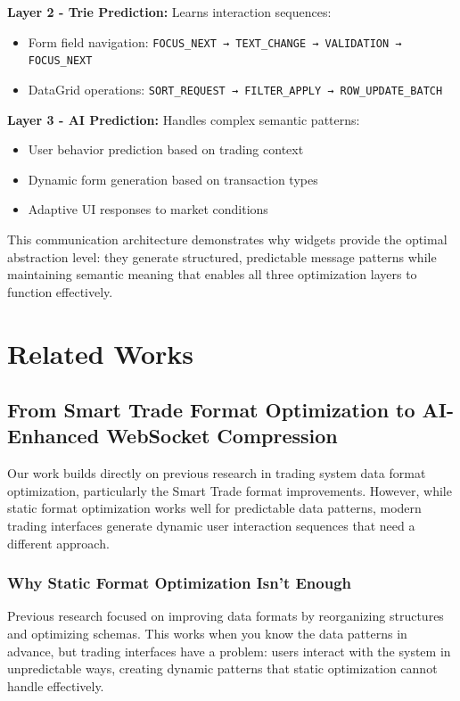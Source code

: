 \documentclass[12pt,a4paper]{article}
\begin{document}
\textbf{Layer 2 - Trie Prediction:} Learns interaction sequences:
\begin{itemize}
\item Form field navigation: \texttt{FOCUS\_NEXT → TEXT\_CHANGE → VALIDATION → FOCUS\_NEXT}
\item DataGrid operations: \texttt{SORT\_REQUEST → FILTER\_APPLY → ROW\_UPDATE\_BATCH}
\end{itemize}

\textbf{Layer 3 - AI Prediction:} Handles complex semantic patterns:
\begin{itemize}
\item User behavior prediction based on trading context
\item Dynamic form generation based on transaction types
\item Adaptive UI responses to market conditions
\end{itemize}

This communication architecture demonstrates why widgets provide the optimal abstraction level: they generate structured, predictable message patterns while maintaining semantic meaning that enables all three optimization layers to function effectively.

\section{Related Works}

\subsection{From Smart Trade Format Optimization to AI-Enhanced WebSocket Compression}

Our work builds directly on previous research in trading system data format optimization, particularly the Smart Trade format improvements. However, while static format optimization works well for predictable data patterns, modern trading interfaces generate dynamic user interaction sequences that need a different approach.

\subsubsection{Why Static Format Optimization Isn't Enough}

Previous research focused on improving data formats by reorganizing structures and optimizing schemas. This works when you know the data patterns in advance, but trading interfaces have a problem: users interact with the system in unpredictable ways, creating dynamic patterns that static optimization cannot handle effectively.
\end{document}
